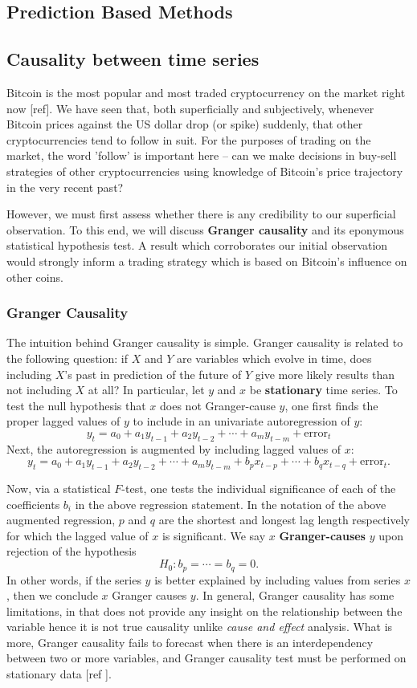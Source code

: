 \documentclass[twoside]{report}
\begin{document}
\begin{spacing}{1}


\chapter{Prediction Based Methods}
\section{Causality between time series}
Bitcoin is the most popular and most traded cryptocurrency on the market right now [ref]. We have seen that, both superficially and subjectively, whenever Bitcoin prices against the US dollar drop (or spike) suddenly, that other cryptocurrencies tend to follow in suit. For the purposes of trading on the market, the word 'follow' is important here -- can we make decisions in buy-sell strategies of other cryptocurrencies using knowledge of Bitcoin's price trajectory in the very recent past? 

However, we must first assess whether there is any credibility to our superficial observation. To this end, we will discuss \textbf{Granger causality} and its eponymous statistical hypothesis test. A result which corroborates our initial observation would strongly inform a trading strategy which is based on Bitcoin's influence on other coins. 
\subsection{Granger Causality}
The intuition behind Granger causality is simple. Granger causality is related to the following question: if $X$ and $Y$ are variables which evolve in time, does including $X$'s past in prediction of the future of $Y$ give more likely results than not including $X$ at all? In particular, let $y$ and $x$ be \textbf{stationary} time series. To test the null hypothesis that $x$ does not Granger-cause $y$, one first finds the proper lagged values of $y$ to include in an univariate autoregression of $y$:
\[y_t = a_0 + a_1y_{t-1} + a_2y_{t-2} + \cdots + a_my_{t-m} + \text{error}_t\]
Next, the autoregression is augmented by including lagged values of $x$:
\[y_t = a_0 + a_1y_{t-1} + a_2y_{t-2} + \cdots + a_my_{t-m} + b_px_{t-p} + \cdots + b_qx_{t-q} + \text{error}_t.\]

Now, via a statistical $F$-test, one tests the individual significance of each of the coefficients $b_i$ in the above regression statement. In the notation of the above augmented regression, $p$ and $q$ are the shortest and longest lag length respectively for which the lagged value of $x$ is significant. We say $x$ \textbf{Granger-causes} $y$ upon rejection of the hypothesis \[
H_0: b_p = \cdots = b_q = 0. 
\]
In other words, if the series $y$ is better explained by including values from series $x$, then we conclude $x$ Granger causes $y$. 
In general, Granger causality has some limitations, in that does not provide any insight on the relationship between the variable hence it is not true causality unlike \textit{cause and effect} analysis. What is more, Granger causality fails to forecast when there is an interdependency between two or more variables, and Granger causality test must be performed on stationary data [ref ].


\end{spacing}
\end{document}

